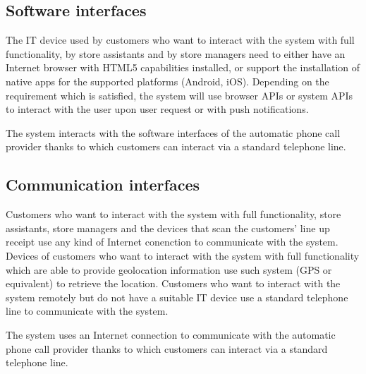 \documentclass[../../main.tex]{subfiles}
\begin{document}
\subsection{Software interfaces}

The IT device used by customers who want to interact with the system with full
functionality, by store assistants and by store managers need to either have an
Internet browser with HTML5 capabilities installed, or support the installation
of native apps for the supported platforms (Android, iOS). Depending on the
requirement which is satisfied, the system will use browser APIs or system APIs
to interact with the user upon user request or with push notifications.

The system interacts with the software interfaces of the automatic phone call
provider thanks to which customers can interact via a standard telephone line.

\subsection{Communication interfaces}

Customers who want to interact with the system with full functionality, store
assistants, store managers and the devices that scan the customers' line up
receipt use any kind of Internet conenction to communicate with the system.
Devices of customers who want to interact with the system with full
functionality which are able to provide geolocation information use such system
(GPS or equivalent) to retrieve the location. Customers who want to interact
with the system remotely but do not have a suitable IT device use a standard
telephone line to communicate with the system.

The system uses an Internet connection to communicate with the automatic phone
call provider thanks to which customers can interact via a standard telephone
line.
\end{document}
